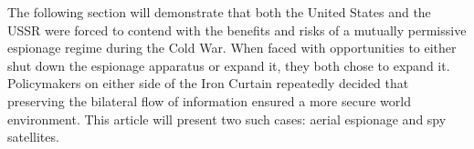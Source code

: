 \documentclass[14pt]{extarticle}
\begin{document}


The following section will demonstrate that both the United States and the USSR were forced to contend with the benefits and risks of a mutually permissive espionage regime during the Cold War. When faced with opportunities to either shut down the espionage apparatus or expand it, they both chose to expand it. Policymakers on either side of the Iron Curtain repeatedly decided that preserving the bilateral flow of information ensured a more secure world environment. This article will present two such cases: aerial espionage and spy satellites.


\end{document}
